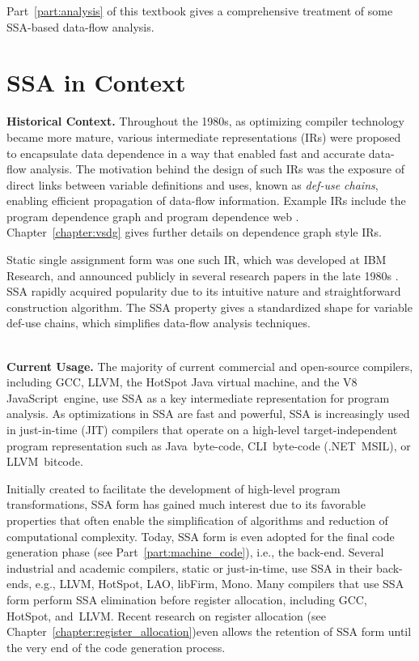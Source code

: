 Part~\ref{part:analysis} of this textbook gives a comprehensive treatment of some SSA-based data-flow analysis.




\section{SSA in Context}

\textbf{Historical Context.}
Throughout the 1980s, as optimizing compiler technology became more mature, various intermediate representations (IRs) were proposed to encapsulate data dependence in a way that enabled fast and accurate data-flow analysis. 
The motivation behind the design of such IRs was the exposure of direct links between variable definitions and uses, known as \textit{def-use chains}, enabling efficient propagation of data-flow information. 
Example IRs include the program dependence graph \cite{ferrante87program} and program dependence web \cite{ottenstein90program}. 
Chapter~\ref{chapter:vsdg} gives further details on dependence graph style IRs.

Static single assignment form was one such IR, which was developed at IBM Research, and announced publicly in several research papers in the late 1980s \cite{rosen88global,alpern88detecting,cytron89efficient}. 
SSA rapidly acquired popularity due to its intuitive nature and straightforward construction algorithm. 
The SSA property gives a standardized shape for variable def-use chains, which simplifies data-flow analysis techniques.

~\\ \textbf{Current Usage.}
The majority of current commercial and open-source compilers, including GCC, LLVM, the HotSpot Java virtual machine, and the V8 JavaScript~engine, use SSA as a key intermediate representation for program analysis. 
As optimizations in SSA are fast and powerful, SSA is increasingly used in just-in-time (JIT) compilers that operate on a high-level target-independent program representation such as Java~byte-code, CLI~byte-code (.NET~MSIL), or LLVM~bitcode.



Initially created to facilitate the development of high-level program transformations, SSA form has gained much interest due to its favorable properties that often enable the simplification of algorithms and reduction of computational complexity. 
Today, SSA form is even adopted for the final code generation phase (see Part~\ref{part:machine_code}), i.e., the back-end. 
Several industrial and academic compilers, static or just-in-time, use SSA in their back-ends, e.g., LLVM, HotSpot, LAO, libFirm, Mono. 
Many compilers that use SSA form perform SSA elimination before register allocation, including GCC, HotSpot, and~LLVM. 
Recent research on register allocation \ifregin (see Chapter~\ref{chapter:register_allocation})\fi even allows the retention of SSA form until the very end of the code generation process.

